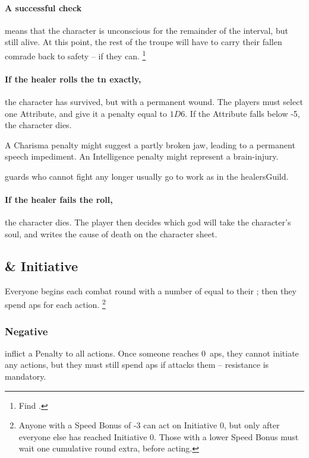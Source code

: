 \begin{multicols}{2}
\paragraph{A successful check}
means that the character is unconscious for the remainder of the \gls{interval}, but still alive.
At this point, the rest of the troupe will have to carry their fallen comrade back to safety -- if they can.%
\footnote{Find  .}

\paragraph{If the healer rolls the \gls{tn} exactly,}
the character has survived, but with a permanent wound.
The players must select one Attribute, and give it a penalty equal to $1D6$.
If the Attribute falls below -5, the character dies.

A Charisma penalty might suggest a partly broken jaw, leading to a permanent speech impediment.
An Intelligence penalty might represent a brain-injury.

\Glspl{guard} who cannot fight any longer usually go to work as  in the \gls{healersGuild}.

\paragraph{If the healer fails the roll,}
the character dies.
The player then decides which god will take the character's soul, and writes the cause of death on the character sheet.

\subsection{ \& Initiative}
\label{actionPoints}

Everyone begins each \gls{combat} \gls{round} with a number of  equal to their ; then they spend \glspl{ap} for each action.%
\footnote{Anyone with a Speed Bonus of -3 can act on Initiative 0, but only after everyone else has reached Initiative 0.
Those with a lower Speed Bonus must wait one cumulative round extra, before acting.}

\subsubsection{Negative }
inflict a Penalty to all \glspl{action}.
Once someone reaches 0~\glspl{ap}, they cannot initiate any actions, but they must still spend \glspl{ap} if  attacks them -- resistance is mandatory.


\end{multicols}
